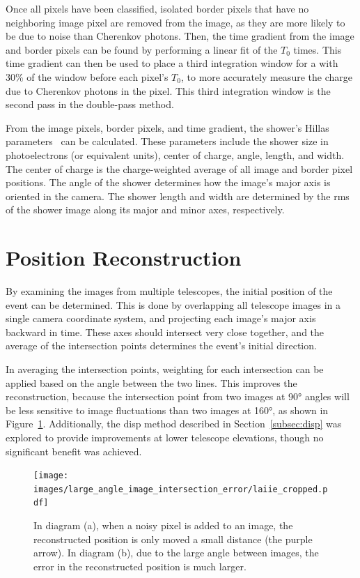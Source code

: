   Once all pixels have been classified, isolated border pixels that have no neighboring image pixel are removed from the image, as they are more likely to be due to noise than Cherenkov photons.
  Then, the time gradient from the image and border pixels can be found by performing a linear fit of the $T_{0}$ times.
  This time gradient can then be used to place a third integration window for a 
with 30\% of the window before each pixel's $T_{0}$, to more accurately measure the charge due to Cherenkov photons in the pixel.
  This third integration window is the second pass in the double-pass method.

  From the image pixels, border pixels, and time gradient, the shower's Hillas parameters~\cite{hillas_params} can be calculated.
  These parameters include the shower size in photoelectrons (or equivalent units), center of charge, angle, length, and width.
  The center of charge is the charge-weighted average of all image and border pixel positions.
  The angle of the shower determines how the image's major axis is oriented in the camera.
  The shower length and width are determined by the rms of the shower image along its major and minor axes, respectively.

\section{Position Reconstruction}\label{subsec:posrecon}
  By examining the images from multiple telescopes, the initial position of the event can be determined.
  This is done by overlapping all telescope images in a single camera coordinate system, and projecting each image's major axis backward in time.
  These axes should intersect very close together, and the average of the intersection points determines the event's initial direction.

  In averaging the intersection points, weighting for each intersection can be applied based on the angle between the two lines.
  This improves the reconstruction, because the intersection point from two images at \ang{90} angles will be less sensitive to image fluctuations than two images at \ang{160}, as shown in Figure~\ref{fig:largeintersectangle}.
  Additionally, the disp method described in Section~\ref{subsec:disp} was explored to provide improvements at lower telescope elevations, though no significant benefit was achieved.

  \begin{figure}[!t]
    \centering
    \texttt{[image: images/large\_angle\_image\_intersection\_error/laiie\_cropped.pdf]}
    \caption[Large Image Intersection Angles]{
      In diagram (a), when a noisy pixel is added to an image, the reconstructed position is only moved a small distance (the purple arrow).
      In diagram (b), due to the large angle between images, the error in the reconstructed position is much larger.
    }
    \label{fig:largeintersectangle}
  \end{figure}
  \FloatBarrier


